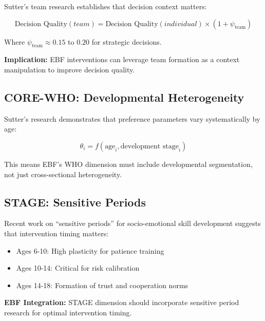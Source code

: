 Sutter's team research establishes that decision context matters:

\begin{equation}
\text{Decision Quality}(team) = \text{Decision Quality}(individual) \times (1 + \psi_{\text{team}})
\end{equation}

Where $\psi_{\text{team}} \approx 0.15$ to $0.20$ for strategic decisions.

\textbf{Implication:} EBF interventions can leverage team formation as a
context manipulation to improve decision quality.

\subsection{CORE-WHO: Developmental Heterogeneity}

Sutter's research demonstrates that preference parameters vary systematically
by age:

\begin{equation}
\theta_i = f(\text{age}_i, \text{development stage}_i)
\end{equation}

This means EBF's WHO dimension must include developmental segmentation,
not just cross-sectional heterogeneity.

\subsection{STAGE: Sensitive Periods}

Recent work on ``sensitive periods'' for socio-emotional skill development
suggests that intervention timing matters:

\begin{itemize}[nosep]
    \item Ages 6-10: High plasticity for patience training
    \item Ages 10-14: Critical for risk calibration
    \item Ages 14-18: Formation of trust and cooperation norms
\end{itemize}

\textbf{EBF Integration:} STAGE dimension should incorporate sensitive period
research for optimal intervention timing.


